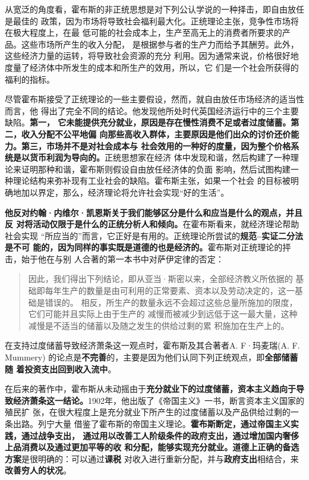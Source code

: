 从宽泛的角度看，霍布斯的非正统思想是对下列公认学说的一种择击，即自由放任是最佳的
政策，因为市场将导致社会福利最大化。正统理论主张，竞争性市场将在极大程度上，在最
低可能的社会成本上，生产至高无上的消费者所要求的产品。这些市场所产生的收入分配，
是根据参与者的生产力而给予其酬劳。此外，这些经济力量的运转，将导致社会资源的充分
利用。因为通常来说，价格很好地度量了经济体中所发生的成本和所生产的效用，所以，它
们是一个社会所获得的福利的指标。

尽管霍布斯接受了正统理论的一些主要假设，然而，就自由放任市场经济的适当性而言，他
得出了完全不同的结论。他发现他所处时代英国经济运行中的三个主要缺陷。\textbf{第一，
它未能提供充分就业，原因是存在慢性消费不足或者过度储蓄。第二，收入分配不公平地偏
向那些高收入群体，主要原因是他们出众的讨价还价能力。第三，市场并不是对社会成本与
社会效用的一种好的度量，因为整个价格系统是以货币利润为导向的。}正统思想家在经济
体中发现和谐，然后构建了一种理论来证明那种和谐，霍布斯则假设自由放任经济体的负面
影响，然后试图构建一种理论结构来弥补现有工业社会的缺陷。霍布斯主张，如果一个社会
的目标被明确地加以界定，那么，经济理论将允许社会实现“好的生活”。

\textbf{他反对约翰·内维尔·凯恩斯关于我们能够区分是什么和应当是什么的观点，并且反
对将活动仅限于是什么的正统分析人和倾向。}在霍布斯看来，就经济理论帮助社会实现
“所应当的”而言，它正好是有用的。正统理论所尝试的\textbf{规范--实证二分法是不可
能的，因为同样的事实既是道德的也是经济的。}霍布斯对正统理论的抨击，始于他在与别
人合著的第一本书中对萨伊定律的否定：

\begin{quotation}因此，我们得出下列结论，即从亚当·斯密以来，全部经济教义所依据的
基础即每年生产的数量是由可利用的正常要素、资本以及劳动决定的，这一基础是错误的。
相反，所生产的数量永远不会超过这些总量所施加的限度，它们可能并且实际上由于生产的
减慢而被减少到远低于这一最大量，这种减慢是不适当的储蓄以及随之发生的供给过剩的累
积施加在生产上的。
\end{quotation}

在支持过度储蓄导致经济萧条这一观点时，霍布斯及其合著者A. F·玛麦瑞(A. F. Mummery)
的论点是\textbf{不完善}的，主要是因为他们认同下列正统观点，即\textbf{全部储蓄随
着投资支出回到收入流中}。

在后来的著作中，霍布斯从未动摇由于\textbf{充分就业下的过度储蓄，资本主义趋向于导
致经济萧条这一结论。}1902年，他出版了《帝国主义》一书，断言资本主义国家的殖民扩
张，在很大程度上是充分就业下所产生的过度储蓄以及产品供给过剩的一条出路。列宁大量
借鉴了霍布斯的帝国主义理论。\textbf{霍布斯断定，通过帝国主义实践，通过战争支出，
通过用以改善工人阶级条件的政府支出，通过增加国内奢侈上品消费以及通过更加平等的收
和分配，能够实现充分就业。道德上正确的备选方案}是很明确的：可以通过\textbf{课税}
对收入进行重新分配，并与\textbf{政府支出}相结合，来\textbf{改善穷人的状况}。

